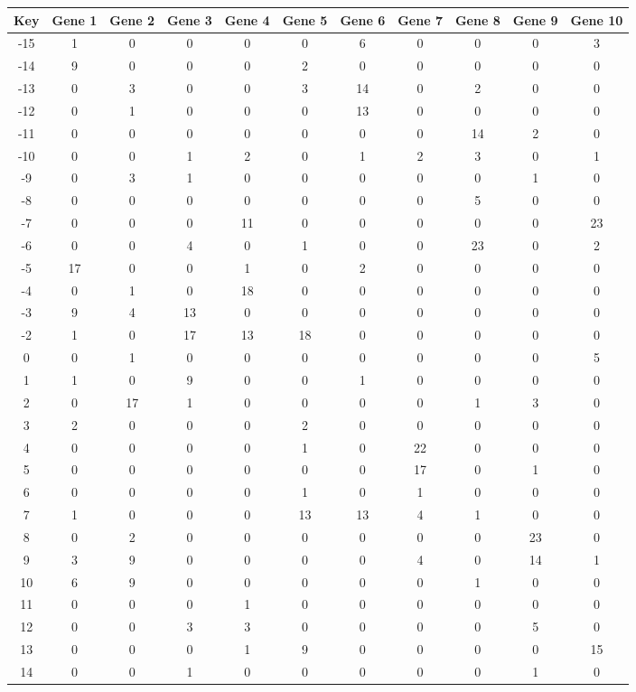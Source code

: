 \begin{tabular}{|c|c|c|c|c|c|c|c|c|c|c|}
\hline
Key & Gene 1 & Gene 2 & Gene 3 & Gene 4 & Gene 5 & Gene 6 & Gene 7 & Gene 8 & Gene 9 & Gene 10 \\
\hline
-15 & 1 & 0 & 0 & 0 & 0 & 6 & 0 & 0 & 0 & 3 \\
-14 & 9 & 0 & 0 & 0 & 2 & 0 & 0 & 0 & 0 & 0 \\
-13 & 0 & 3 & 0 & 0 & 3 & 14 & 0 & 2 & 0 & 0 \\
-12 & 0 & 1 & 0 & 0 & 0 & 13 & 0 & 0 & 0 & 0 \\
-11 & 0 & 0 & 0 & 0 & 0 & 0 & 0 & 14 & 2 & 0 \\
-10 & 0 & 0 & 1 & 2 & 0 & 1 & 2 & 3 & 0 & 1 \\
-9 & 0 & 3 & 1 & 0 & 0 & 0 & 0 & 0 & 1 & 0 \\
-8 & 0 & 0 & 0 & 0 & 0 & 0 & 0 & 5 & 0 & 0 \\
-7 & 0 & 0 & 0 & 11 & 0 & 0 & 0 & 0 & 0 & 23 \\
-6 & 0 & 0 & 4 & 0 & 1 & 0 & 0 & 23 & 0 & 2 \\
-5 & 17 & 0 & 0 & 1 & 0 & 2 & 0 & 0 & 0 & 0 \\
-4 & 0 & 1 & 0 & 18 & 0 & 0 & 0 & 0 & 0 & 0 \\
-3 & 9 & 4 & 13 & 0 & 0 & 0 & 0 & 0 & 0 & 0 \\
-2 & 1 & 0 & 17 & 13 & 18 & 0 & 0 & 0 & 0 & 0 \\
0 & 0 & 1 & 0 & 0 & 0 & 0 & 0 & 0 & 0 & 5 \\
1 & 1 & 0 & 9 & 0 & 0 & 1 & 0 & 0 & 0 & 0 \\
2 & 0 & 17 & 1 & 0 & 0 & 0 & 0 & 1 & 3 & 0 \\
3 & 2 & 0 & 0 & 0 & 2 & 0 & 0 & 0 & 0 & 0 \\
4 & 0 & 0 & 0 & 0 & 1 & 0 & 22 & 0 & 0 & 0 \\
5 & 0 & 0 & 0 & 0 & 0 & 0 & 17 & 0 & 1 & 0 \\
6 & 0 & 0 & 0 & 0 & 1 & 0 & 1 & 0 & 0 & 0 \\
7 & 1 & 0 & 0 & 0 & 13 & 13 & 4 & 1 & 0 & 0 \\
8 & 0 & 2 & 0 & 0 & 0 & 0 & 0 & 0 & 23 & 0 \\
9 & 3 & 9 & 0 & 0 & 0 & 0 & 4 & 0 & 14 & 1 \\
10 & 6 & 9 & 0 & 0 & 0 & 0 & 0 & 1 & 0 & 0 \\
11 & 0 & 0 & 0 & 1 & 0 & 0 & 0 & 0 & 0 & 0 \\
12 & 0 & 0 & 3 & 3 & 0 & 0 & 0 & 0 & 5 & 0 \\
13 & 0 & 0 & 0 & 1 & 9 & 0 & 0 & 0 & 0 & 15 \\
14 & 0 & 0 & 1 & 0 & 0 & 0 & 0 & 0 & 1 & 0 \\
\hline
\end{tabular}
